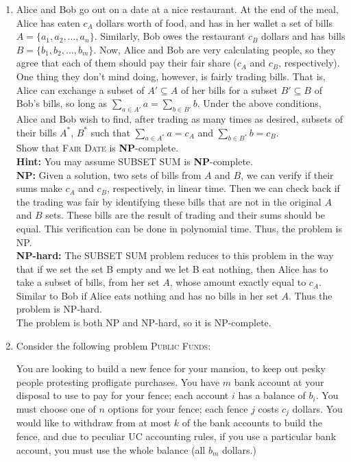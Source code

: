 \documentclass{article}\usepackage[utf8]{inputenc}\usepackage[margin=0.4cm,top=0.4cm,bottom=0.4cm]{geometry}\usepackage[usenames,dvipsnames,svgnames,table]{xcolor}
\begin{document}
\begin{enumerate}[1.]
\item Alice and Bob go out on a date at a nice restaurant. At the end of the meal, Alice has eaten $c_A$ dollars worth of food, and has in her wallet a set of bills $A=\big\{a_1,a_2,\ldots ,a_n\big\}$. Similarly, Bob owes the restaurant $c_B$ dollars and has bills $B=\big\{b_1,b_2,\ldots ,b_m\big\}$. Now, Alice and Bob are very calculating people, so they agree that each of them should pay their fair share ($c_A$ and $c_B$, respectively).\\[2pt]
One thing they don't mind doing, however, is fairly trading bills. That is, Alice can exchange a subset of $A'\subseteq A$ of her bills for a subset $B'\subseteq B$ of Bob's bills, so long as $\sum_{a\in A'} a=\sum_{b\in B'} b$. Under the above conditions, Alice and Bob wish to find, after trading as many times as desired, subsets of their bills $A^*$, $B^*$ such that $\sum_{a\in A^*} a = c_A$ and $\sum_{b\in B^*} b = c_B$.\\[4pt]
Show that \textsc{Fair Date} is \textbf{NP}-complete.\\[2pt]
\textbf{Hint:} You may assume \textsc{SUBSET SUM} is \textbf{NP}-complete.
\BeginSolution %
\\
\textbf{NP:} Given a solution, two sets of bills from $A$ and $B$, we can verify if their sums make $c_A$ and $c_B$, respectively, in linear time. Then we can check back if the trading was fair by identifying these bills that are not in the original $A$ and $B$ sets. These bills are the result of trading and their sums should be equal. This verification can be done in polynomial time. Thus, the problem is NP.\\
\textbf{NP-hard:} The SUBSET SUM problem reduces to this problem in the way that if we set the set B empty and we let B eat nothing, then Alice has to take a subset of bills, from her set $A$, whose amount exactly equal to $c_A$. Similar to Bob if Alice eats nothing and has no bills in her set $A$. Thus the problem is NP-hard.\\
The problem is both NP and NP-hard, so it is NP-complete.
\EndSolution
\item Consider the following problem \textsc{Public Funds}:
\begin{addmargin}[0.75cm]{0cm}
You are looking to build a new fence for your mansion, to keep out pesky people protesting profligate purchases. You have $m$ bank account at your disposal to use to pay for your fence; each account $i$ has a balance of $b_i$. You must choose one of $n$ options for your fence; each fence $j$ costs $c_j$ dollars. You would like to withdraw from at most $k$ of the bank accounts to build the fence, and due to peculiar UC accounting rules, if you use a particular bank account, you must use the whole balance (all $b_m$ dollars.)\\[2pt]

\end{addmargin}
\end{enumerate}
\end{document}
